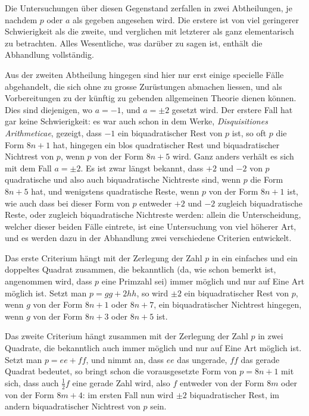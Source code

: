 Die Untersuchungen über diesen Gegenstand zerfallen in zwei Abtheilungen, je nachdem $p$ oder $a$ als gegeben angesehen wird. Die erstere ist von viel geringerer Schwierigkeit als die zweite, und verglichen mit letzterer als ganz elementarisch zu betrachten. Alles Wesentliche, was darüber zu sagen ist, enthält die Abhandlung vollständig.

Aus der zweiten Abtheilung hingegen sind hier nur erst einige specielle Fälle abgehandelt, die sich ohne zu grosse Zurüstungen abmachen liessen, und als Vorbereitungen zu der künftig zu gebenden allgemeinen Theorie dienen können. Dies sind diejenigen, wo $a=-1$, und $a=\pm2$ gesetzt wird. Der erstere Fall hat gar keine Schwierigkeit: es war auch schon in dem Werke, \emph{Disquisitiones Arithmeticae}, gezeigt, dass $-1$ ein biquadratischer Rest von $p$ ist, so oft $p$ die Form $8n+1$ hat, hingegen ein blos quadratischer Rest und biquadratischer Nichtrest von $p$, wenn $p$ von der Form $8n+5$ wird. Ganz anders verhält es sich mit dem Fall $a=\pm2$. Es ist zwar längst bekannt, dass $+2$ und $-2$ von $p$ quadratische und also auch biquadratische Nichtreste sind, wenn $p$ die Form $8n+5$ hat, und wenigstens quadratische Reste, wenn $p$ von der Form $8n+1$ ist, wie auch dass bei dieser Form von $p$ entweder $+2$ und $-2$ zugleich biquadratische Reste, oder zugleich biquadratische Nichtreste werden: 
%
allein die Unterscheidung, welcher dieser beiden Fälle eintrete, ist eine Untersuchung von viel höherer Art, und es werden dazu in der Abhandlung zwei verschiedene Criterien entwickelt.

Das erste Criterium hängt mit der Zerlegung der Zahl $p$ in ein einfaches und ein doppeltes Quadrat zusammen, die bekanntlich (da, wie schon bemerkt ist, angenommen wird, dass $p$ eine Primzahl sei) immer möglich und nur auf Eine Art möglich ist. Setzt man $p=gg+2hh$, so wird $\pm2$ ein biquadratischer Rest von $p$, wenn $g$ von der Form $8n+1$ oder $8n+7$, ein biquadratischer Nichtrest hingegen, wenn $g$ von der Form $8n+3$ oder $8n+5$ ist.

Das zweite Criterium hängt zusammen mit der Zerlegung der Zahl $p$ in zwei Quadrate, die bekanntlich auch immer möglich und nur auf Eine Art möglich ist. Setzt man $p=ee+ff$, und nimmt an, dass $ee$ das ungerade, $ff$ das gerade Quadrat bedeutet, so bringt schon die vorausgesetzte Form von $p=8n+1$ mit sich, dass auch $\frac12f$ eine gerade Zahl wird, also $f$ entweder von der Form $8m$ oder von der Form $8m+4$: im ersten Fall nun wird $\pm2$ biquadratischer Rest, im andern biquadratischer Nichtrest von $p$ sein.

